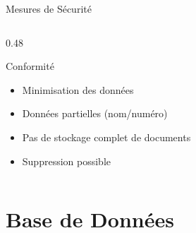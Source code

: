\documentclass[aspectratio=169]{beamer}
\begin{document}
\begin{frame}{Mesures de Sécurité}
\begin{columns}[T]
\begin{column}{0.48\textwidth}
            \vspace{0.3cm}

            \begin{block}{Conformité}
                \begin{itemize}
                    \item Minimisation des données
                    \item Données partielles (nom/numéro)
                    \item Pas de stockage complet de documents
                    \item Suppression possible
                \end{itemize}
            \end{block}
        \end{column}
    \end{columns}
\end{frame}

\section{Base de Données}
\end{document}
